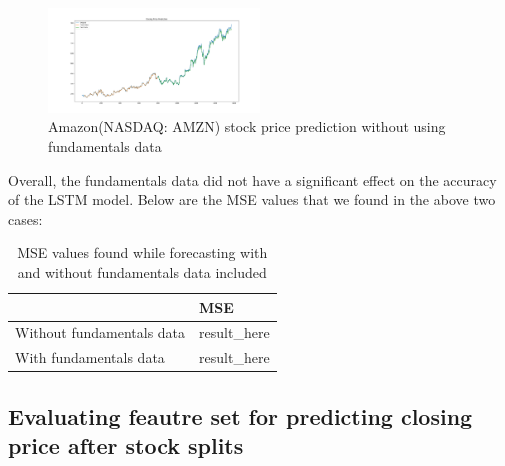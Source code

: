 \documentclass{article}
\begin{document}
\begin{figure}[h]
\centering
\includegraphics[width=0.5\textwidth]{amazon_without_fundamentals}
\caption{Amazon(NASDAQ: AMZN) stock price prediction without using fundamentals data}
\label{fig:amazon_without_funda}
\end{figure}

Overall, the fundamentals data did not have a significant effect on the accuracy of the LSTM model. Below are the MSE values that we found in the above two cases:
\begin{table}[H]
\centering
\label{evaluation_mse_amazon}
\begin{tabular}{|l|l|}
\hline
                          & MSE          \\ \hline
Without fundamentals data & result\_here \\ \hline
With fundamentals data    & result\_here \\ \hline
\end{tabular}
\caption{MSE values found while forecasting with and without fundamentals data included}
\end{table}
 
\subsection{Evaluating feautre set for predicting closing price after stock splits}
\label{sssec:predicting_stock_splits}
\end{document}
